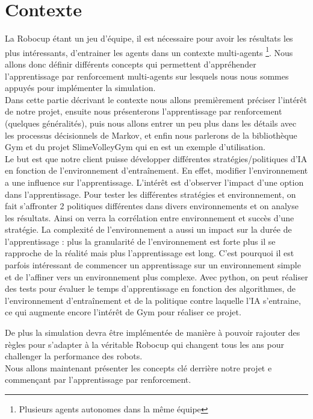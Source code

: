 \documentclass[11pt, a4paper]{article}
\begin{document}
	\section{Contexte}


	La Robocup étant un jeu d'équipe, il est nécessaire pour avoir les résultats les plus intéressants, d'entrainer les agents dans un contexte multi-agents \footnote{Plusieurs agents autonomes dans la même équipe}. Nous allons donc définir différents concepts qui permettent d'appréhender l'apprentissage par renforcement multi-agents sur lesquels nous nous sommes appuyés pour implémenter la simulation.\\
	Dans cette partie décrivant le contexte nous allons premièrement préciser l'intérêt de notre projet, ensuite nous présenterons l'apprentissage par renforcement (quelques généralités), puis nous allons entrer un peu plus dans les détails avec les processus décisionnels de Markov, et enfin nous parlerons de la bibliothèque Gym et du projet SlimeVolleyGym qui en est un exemple d'utilisation.\\


	Le but est que notre client puisse développer différentes stratégies/politiques d'IA en fonction de l'environnement d'entraînement. En effet, modifier l'environnement a une influence sur l'apprentissage. L'intérêt est d'observer l'impact d'une option dans l'apprentissage. Pour tester les différentes stratégies et environnement, on fait s'affronter 2 politiques différentes dans divers environnements et on analyse les résultats. Ainsi on verra la corrélation entre environnement et succès d'une stratégie.
	La complexité de l'environnement a aussi un impact sur la durée de l'apprentissage : plus la granularité de l'environnement est forte plus il se rapproche de la réalité mais plus l'apprentissage est long.  C'est pourquoi il est parfois intéressant de commencer un apprentissage sur un environnement simple et de l'affiner vers un environnement plus complexe. Avec python, on peut réaliser des tests pour évaluer le temps d'apprentissage en fonction des algorithmes, de l'environnement d'entraînement et de la politique contre laquelle l'IA s'entraine, ce qui augmente encore l'intérêt de Gym pour réaliser ce projet.

	De plus la simulation devra être implémentée de manière à pouvoir rajouter des règles pour s'adapter à la véritable Robocup qui changent tous les ans pour challenger la performance des robots.\\

	Nous allons maintenant présenter les concepts clé derrière notre projet e commençant par l'apprentissage par renforcement.
\end{document}

